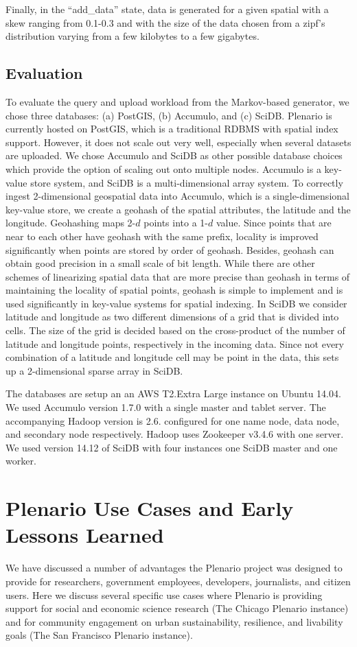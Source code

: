\documentclass[11pt]{article}
\begin{document}
Finally, in the ``add\_data'' state, data is generated for a given spatial with a skew ranging from 0.1-0.3 and with the size of the data chosen from a zipf's distribution varying from a few kilobytes to a few gigabytes.  


\subsection{Evaluation}
To evaluate the query and upload workload from the Markov-based generator, we chose three databases: (a) PostGIS, (b) Accumulo, and (c) SciDB. Plenario is currently hosted on PostGIS, which is a traditional RDBMS with spatial index support. However, it does not scale out very well, especially when several datasets are uploaded. We chose Accumulo and SciDB as other possible database choices which provide the option of scaling out onto multiple nodes. Accumulo is a key-value store system, and SciDB is a multi-dimensional array system. To correctly ingest 2-dimensional geospatial data into Accumulo, which is a single-dimensional key-value store, we create a geohash of the spatial attributes, the latitude and the longitude. Geohashing maps 2-$d$ points into a 1-$d$ value. Since points that are near to each other have geohash with the same prefix, locality is improved significantly when points are stored by order of geohash. 
Besides, geohash can obtain good precision in a small scale of bit length. While there are other schemes of linearizing spatial data that are more precise than geohash in terms of maintaining the locality of spatial points, geohash is simple to implement and is used significantly in key-value systems for spatial indexing. In SciDB we consider latitude and longitude as two different dimensions of a grid that is divided into cells. The size of the grid is decided based on the cross-product of the number of latitude and longitude points, respectively in the incoming data. Since not every combination of a latitude and longitude cell may be point in the data, this sets up a 2-dimensional sparse array in SciDB. 

The databases are setup an an AWS T2.Extra Large instance on Ubuntu 14.04. We used Accumulo version 1.7.0 with a single master and tablet server. The accompanying Hadoop version is 2.6. configured for one name node, data node, and secondary node respectively. Hadoop uses Zookeeper v3.4.6 with one server. We used version 14.12 of SciDB with four instances one SciDB master and one worker. 

\section{Plenario Use Cases and Early Lessons Learned}
We have discussed a number of advantages the Plenario project was designed to provide for researchers, government employees, developers, journalists, and citizen users. Here we discuss several specific use cases where Plenario is providing support for social and economic science research (The Chicago Plenario instance) and for community engagement on urban sustainability, resilience, and livability goals (The San Francisco Plenario instance). 
\end{document}
